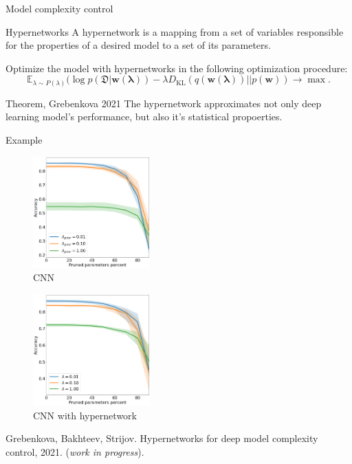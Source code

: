\documentclass[usenames,dvipsnames,11pt,pdf,utf8,russian,aspectratio=169]{beamer}
\begin{document}
\begin{frame}{Model complexity control}
\begin{block}{Hypernetworks}
A hypernetwork is a mapping from a set of variables responsible for the properties of a desired model to a set of its parameters.
\end{block}

Optimize the model with hypernetworks in the following optimization procedure:
\[
\mathbb{E}_{\lambda \sim P(\lambda)}
(\log p(\mathfrak{D}| \mathbf{w(\lambda)})
- \lambda D_{\text{KL}}(q(\mathbf{w(\lambda)})||p(\mathbf{w})) 
\to \max.
\]

\begin{block}{Theorem, Grebenkova 2021}
The hypernetwork approximates not only deep learning model's performance, but also it's statistical propoerties.
\end{block}
\end{frame}


\begin{frame}{Example}
\vspace{-0.5cm}
\begin{multicols}{2}
\begin{figure}[h]
\includegraphics[width=0.4\textwidth]{./cifar_hyper.png}
\caption*{CNN}
\end{figure}

\begin{figure}[h]
\includegraphics[width=0.4\textwidth]{./cifar_kernel.png}
\caption*{CNN with hypernetwork}
\end{figure}
\end{multicols}
{\footnotesize Grebenkova, Bakhteev, Strijov. Hypernetworks for deep model complexity control, 2021. (\textit{work in progress}).}
\end{frame}
\end{document}
